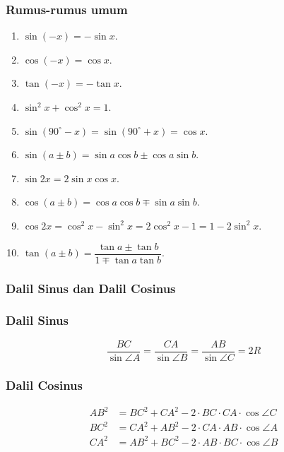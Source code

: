 \documentclass[12pt]{scrartcl}
\begin{document}
\subsubsection{Rumus-rumus umum}
\begin{enumerate}
    \item $\sin (-x) = -\sin x$.
    \item $\cos (-x) = \cos x$.
    \item $\tan(-x) = -\tan x$.
    \item $\sin^2 x + \cos^2 x = 1$.
    \item $\sin(90^\circ-x)=\sin(90^\circ+x)=\cos x$.
    \item $\sin(a \pm b) = \sin a \cos b \pm \cos a \sin b$.
    \item $\sin 2x = 2\sin x \cos x$.
    \item $\cos(a \pm b) = \cos a \cos b \mp \sin a \sin b$.
    \item $\cos 2x = \cos^2 x - \sin^2 x = 2\cos^2 x -1 = 1-2\sin^2 x$.
    \item $\tan(a \pm b) = \dfrac{\tan a \pm \tan b}{1 \mp \tan a \tan b}$.
\end{enumerate}

\subsubsection{Dalil Sinus dan Dalil Cosinus}
\begin{center}
\end{center}
    \subsubsection{Dalil Sinus}
    $$\dfrac{BC}{\sin \angle A} = \dfrac{CA}{\sin \angle B}= \dfrac{AB}{\sin \angle C} = 2R$$
    
    \subsubsection{Dalil Cosinus}
    \begin{align*}
        AB^2 &= BC^2 + CA^2 - 2\cdot BC \cdot CA \cdot \cos \angle C\\
        BC^2 &= CA^2 + AB^2 - 2\cdot CA \cdot AB \cdot \cos \angle A\\
        CA^2 &= AB^2 + BC^2 - 2\cdot AB \cdot BC \cdot \cos \angle B
    \end{align*}
\end{document}
